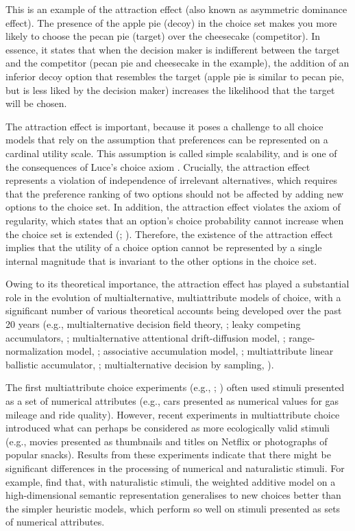 \documentclass[12pt, a4paper]{article}
\begin{document}
This is an example of the attraction effect (also known as asymmetric dominance effect). The presence of the apple pie (decoy) in the choice set makes you more likely to choose the pecan pie (target) over the cheesecake (competitor). In essence, it states that when the decision maker is indifferent between the target and the competitor (pecan pie and cheesecake in the example), the addition of an inferior decoy option that resembles the target (apple pie is similar to pecan pie, but is less liked by the decision maker) increases the likelihood that the target will be chosen.


The attraction effect is important, because it poses a challenge to all choice models that rely on the assumption that preferences can be represented on a cardinal utility scale. This assumption is called simple scalability, and is one of the consequences of Luce's choice axiom \cite{Luce1959}. Crucially, the attraction effect represents a violation of independence of irrelevant alternatives, which requires that the preference ranking of two options should not be affected by adding new options to the choice set. In addition, the attraction effect violates the axiom of regularity, which states that an option's choice probability cannot increase when the choice set is extended (; ). Therefore, the existence of the attraction effect implies that the utility of a choice option cannot be represented by a single internal magnitude that is invariant to the other options in the choice set. 

Owing to its theoretical importance, the attraction effect has played a substantial role in the evolution of multialternative, multiattribute models of choice, with a significant number of various theoretical accounts being developed over the past 20 years (e.g., multialternative decision field theory, ; leaky competing accumulators, ; multialternative attentional drift-diffusion model,   ; range-normalization model, ; associative accumulation model, ; multiattribute linear ballistic accumulator, ; multialternative decision by sampling, ). 

The first multiattribute choice experiments (e.g., ; ) often used stimuli presented as a set of numerical attributes (e.g., cars presented as numerical values for gas mileage and ride quality). However, recent experiments in multiattribute choice introduced what can perhaps be considered as more ecologically valid stimuli (e.g., movies presented as thumbnails and titles on Netflix or photographs of popular snacks). Results from these experiments indicate that there might be significant differences in the processing of numerical and naturalistic stimuli. For example,  find that, with naturalistic stimuli, the weighted additive model on a high-dimensional semantic representation generalises to new choices better than the simpler heuristic models, which perform so well on stimuli presented as sets of numerical attributes. 
\end{document}
